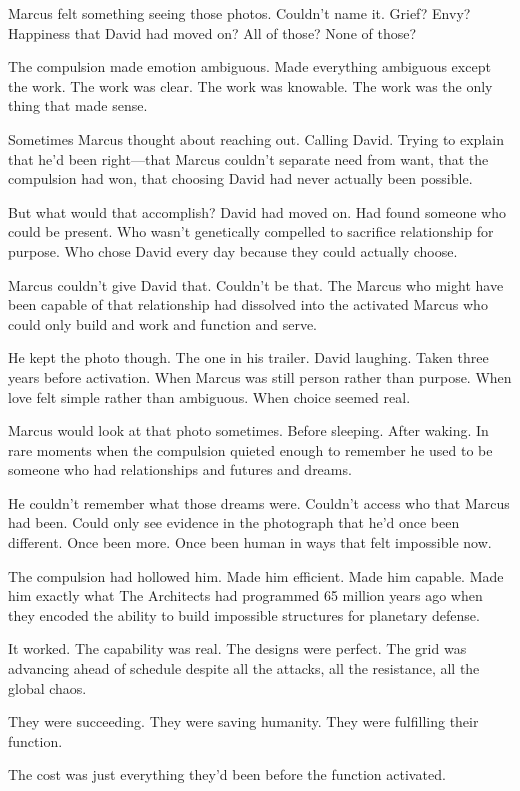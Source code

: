 Marcus felt something seeing those photos. Couldn't name it. Grief? Envy? Happiness that David had moved on? All of those? None of those?

The compulsion made emotion ambiguous. Made everything ambiguous except the work. The work was clear. The work was knowable. The work was the only thing that made sense.

Sometimes Marcus thought about reaching out. Calling David. Trying to explain that he'd been right—that Marcus couldn't separate need from want, that the compulsion had won, that choosing David had never actually been possible.

But what would that accomplish? David had moved on. Had found someone who could be present. Who wasn't genetically compelled to sacrifice relationship for purpose. Who chose David every day because they could actually choose.

Marcus couldn't give David that. Couldn't be that. The Marcus who might have been capable of that relationship had dissolved into the activated Marcus who could only build and work and function and serve.

He kept the photo though. The one in his trailer. David laughing. Taken three years before activation. When Marcus was still person rather than purpose. When love felt simple rather than ambiguous. When choice seemed real.

Marcus would look at that photo sometimes. Before sleeping. After waking. In rare moments when the compulsion quieted enough to remember he used to be someone who had relationships and futures and dreams.

He couldn't remember what those dreams were. Couldn't access who that Marcus had been. Could only see evidence in the photograph that he'd once been different. Once been more. Once been human in ways that felt impossible now.

The compulsion had hollowed him. Made him efficient. Made him capable. Made him exactly what The Architects had programmed 65 million years ago when they encoded the ability to build impossible structures for planetary defense.

It worked. The capability was real. The designs were perfect. The grid was advancing ahead of schedule despite all the attacks, all the resistance, all the global chaos.

They were succeeding. They were saving humanity. They were fulfilling their function.

The cost was just everything they'd been before the function activated.


